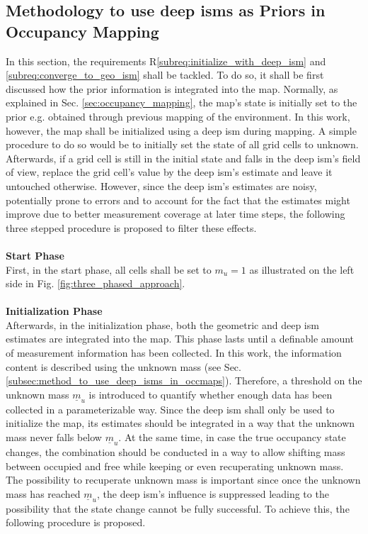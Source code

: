 \subsection{Methodology to use deep \gls{ism}s as Priors in Occupancy Mapping}
\label{subsec:method_to_use_deep_isms_as_priors_in_occmaps}
In this section, the requirements R\ref{subreq:initialize_with_deep_ism} and \ref{subreq:converge_to_geo_ism} shall be tackled. To do so, it shall be first discussed how the prior information is integrated into the map. Normally, as explained in Sec. \ref{sec:occupancy_mapping}, the map's state is initially set to the prior e.g. obtained through previous mapping of the environment. In this work, however, the map shall be initialized using a deep \gls{ism} during mapping. A simple procedure to do so would be to initially set the state of all grid cells to unknown. Afterwards, if a grid cell is still in the initial state and falls in the deep \gls{ism}'s field of view, replace the grid cell's value by the deep \gls{ism}'s estimate and leave it untouched otherwise. However, since the deep \gls{ism}'s estimates are noisy, potentially prone to errors and to account for the fact that the estimates might improve due to better measurement coverage at later time steps, the following three stepped procedure is proposed to filter these effects. 
\\
\\
\textbf{Start Phase}\\
First, in the start phase, all cells shall be set to $m_u = 1$ as illustrated on the left side in Fig. \ref{fig:three_phased_approach}. 
\\
\\
\textbf{Initialization Phase}\\
Afterwards, in the initialization phase, both the geometric and deep \gls{ism} estimates are integrated into the map. This phase lasts until a definable amount of measurement information has been collected. In this work, the information content is described using the unknown mass (see Sec. \ref{subsec:method_to_use_deep_isms_in_occmaps}). Therefore, a threshold on the unknown mass $\underline{m}_u$ is introduced to quantify whether enough data has been collected in a parameterizable way. Since the deep \gls{ism} shall only be used to initialize the map, its estimates should be integrated in a way that the unknown mass never falls below $\underline{m}_u$. At the same time, in case the true occupancy state changes, the combination should be conducted in a way to allow shifting mass between occupied and free while keeping or even recuperating unknown mass. The possibility to recuperate unknown mass is important since once the unknown mass has reached $\underline{m}_u$, the deep \gls{ism}'s influence is suppressed leading to the possibility that the state change cannot be fully successful. To achieve this, the following procedure is proposed.
